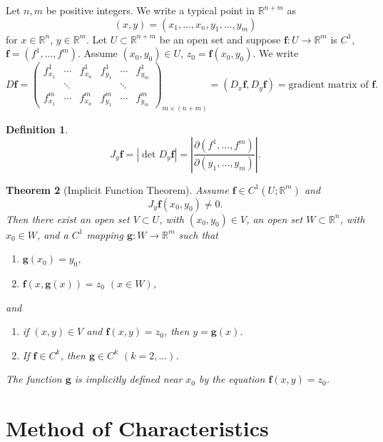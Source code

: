 \documentclass[11pt]{article}
\theoremstyle{plain}
\newtheorem{theorem}{Theorem}[section]
\theoremstyle{definition}
\newtheorem{definition}[theorem]{Definition}
\theoremstyle{remark}
\begin{document}
Let $n, m$ be positive integers. We write a typical point in $\mathbb{R}^{n+m}$ as
$$ (x,y) = (x_1, \dots, x_n, y_1, \dots, y_m) $$
for $x \in \mathbb{R}^n$, $y \in \mathbb{R}^m$. Let $U \subset \mathbb{R}^{n+m}$ be an open set and suppose $\mathbf{f} : U \to \mathbb{R}^m$ is $C^1$, $\mathbf{f} = (f^1, \dots, f^m)$. Assume $(x_0, y_0) \in U$, $z_0 = \mathbf{f}(x_0, y_0)$. We write
$$ D\mathbf{f} = \begin{pmatrix} f^1_{x_1} & \cdots & f^1_{x_n} & f^1_{y_1} & \cdots & f^1_{y_m} \\ & \ddots & & & \ddots & \\ f^m_{x_1} & \cdots & f^m_{x_n} & f^m_{y_1} & \cdots & f^m_{y_m} \end{pmatrix}_{m \times (n+m)} = (D_x\mathbf{f}, D_y \mathbf{f}) = \text{gradient matrix of } \mathbf{f}. $$

\begin{definition}
$$ J_y\mathbf{f} = |\det D_y\mathbf{f}| = \left| \frac{\partial(f^1, \dots, f^m)}{\partial(y_1, \dots, y_m)} \right|. $$
\end{definition}

\begin{theorem}[Implicit Function Theorem]\label{thm:implicit}
Assume $\mathbf{f} \in C^1(U;\mathbb{R}^m)$ and
$$ J_y\mathbf{f}(x_0,y_0) \neq 0. $$
Then there exist an open set $V \subset U$, with $(x_0,y_0) \in V$, an open set $W \subset \mathbb{R}^n$, with $x_0 \in W$, and a $C^1$ mapping $\mathbf{g} : W \to \mathbb{R}^m$ such that
\begin{enumerate}
    \item[(i)] $\mathbf{g}(x_0) = y_0$,
    \item[(ii)] $\mathbf{f}(x, \mathbf{g}(x)) = z_0$ $(x \in W)$,
\end{enumerate}
and
\begin{enumerate}
    \item[(iii)] if $(x,y) \in V$ and $\mathbf{f}(x,y) = z_0$, then $y = \mathbf{g}(x)$.
    \item[(iv)] If $\mathbf{f} \in C^k$, then $\mathbf{g} \in C^k$ $(k = 2, \dots)$.
\end{enumerate}
The function $\mathbf{g}$ is \emph{implicitly defined} near $x_0$ by the equation $\mathbf{f}(x,y) = z_0$.
\end{theorem}

\section{Method of Characteristics}\label{sec:moc}
\end{document}
